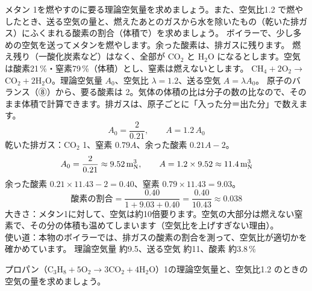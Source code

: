 \label{ph:熱-1:ex9}
\begin{phreidai}[メタンを燃やす空気の量]
メタン 1\qxbmN を燃やすのに要る理論空気量を求めましょう。また、空気比1.2 で燃やしたとき、送る空気の量と、燃えたあとのガスから水を除いたもの（乾いた排ガス）にふくまれる酸素の割合（体積で）を求めましょう。
\phbamen
ボイラーで、少し多めの空気を送ってメタンを燃やします。余った酸素は、排ガスに残ります。
\phmushi
燃え残り（一酸化炭素など）はなく、全部が CO$_2$ と H$_2$O になるとします。空気は酸素21\,\%・窒素79\,\%（体積）とし、窒素は燃えないとします。
\phzu
CH$_4+2$O$_2\to$ CO$_2+2$H$_2$O。理論空気量 $A_0$、空気比 $\lambda=1.2$、送る空気 $A=\lambda A_0$。
\phriyu
原子のバランス（⑧）から、要る酸素は 2\qxbmN{}。気体の体積の比は分子の数の比なので、そのまま体積で計算できます。排ガスは、原子ごとに「入った分＝出た分」で数えます。
\phtateru
\[A_0=\frac{2}{0.21},\qquad A=1.2\,A_0\]
乾いた排ガス：CO$_2$ 1\qxbmN{}、窒素 $0.79A$、余った酸素 $0.21A-2$。
\phtoku
\[A_0=\frac{2}{0.21}\approx9.52\,\mathrm{m}^3_{\mathrm N}{},\qquad A=1.2\times9.52\approx11.4\,\mathrm{m}^3_{\mathrm N}{}\]
余った酸素 $0.21\times11.43-2=0.40$\qxbmN{}、窒素 $0.79\times11.43=9.03$\qxbmN{}。
\[\text{酸素の割合}=\frac{0.40}{1+9.03+0.40}=\frac{0.40}{10.43}\approx0.038\]
\phtashikame
大きさ：メタン1に対して、空気は約10倍要ります。空気の大部分は燃えない窒素で、その分の体積も温めてしまいます（空気比を上げすぎない理由）。\\
使い道：本物のボイラーでは、排ガスの酸素の割合を測って、空気比が適切かを確かめています。
\kotae 理論空気量 約9.5\qxbmN{}、送る空気 約11\qxbmN{}、酸素 約3.8\,\%
\end{phreidai}
\begin{jibun}
プロパン（C$_3$H$_8+5$O$_2\to3$CO$_2+4$H$_2$O）1\qxbmN の理論空気量と、空気比1.2 のときの空気の量を求めましょう。
\end{jibun}

